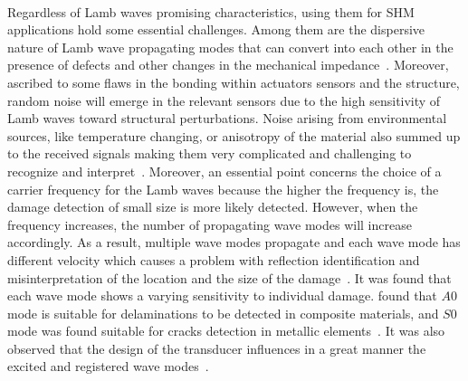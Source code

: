 \paragraph{}
Regardless of Lamb waves promising characteristics, using them for SHM applications hold some essential challenges. 
Among them are the dispersive nature of Lamb wave propagating modes that can convert into each other in the presence of defects and other changes in the mechanical 
impedance~\cite{Willberg2015}. 
Moreover, ascribed to some flaws in the bonding within actuators sensors and the structure, random noise will emerge in the relevant sensors due to the high sensitivity of Lamb waves toward structural perturbations. 
Noise arising from environmental sources, like temperature changing, or anisotropy of the material also summed up to the received signals making them very complicated and challenging to recognize and interpret~\cite{Willberg2015}.
Moreover, an essential point concerns the choice of a carrier frequency for the Lamb waves because the higher the frequency is, the damage detection of small size is more likely detected.
However,  when the frequency increases, the number of propagating wave modes will increase accordingly.
As a result, multiple wave modes propagate and each wave mode has different velocity which causes a problem with reflection identification and misinterpretation of the location and the size of the damage~\cite{Ostachowicz2012}. 
It was found that each wave mode shows a varying sensitivity to individual damage. 
\textcite{Kessler2002b,Ihn2008} found that \(A0\) mode is suitable for delaminations to be detected in composite materials, and \(S0\) mode was found suitable for cracks detection in metallic elements~\cite{Ihn2004,Ihn2008}.
It was also observed that the design of the transducer influences in a great manner the excited and registered wave modes~\cite{Ostachowicz2010}.